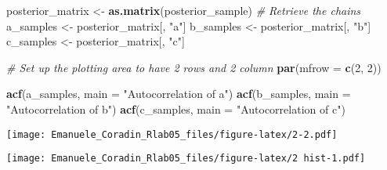 \documentclass[
]{article}
\newenvironment{Shaded}{\begin{snugshade}}{\end{snugshade}}
\newcommand{\AttributeTok}[1]{\textcolor[rgb]{0.13,0.29,0.53}{#1}}
\newcommand{\CommentTok}[1]{\textcolor[rgb]{0.56,0.35,0.01}{\textit{#1}}}
\newcommand{\ConstantTok}[1]{\textcolor[rgb]{0.56,0.35,0.01}{#1}}
\newcommand{\DecValTok}[1]{\textcolor[rgb]{0.00,0.00,0.81}{#1}}
\newcommand{\FunctionTok}[1]{\textcolor[rgb]{0.13,0.29,0.53}{\textbf{#1}}}
\newcommand{\NormalTok}[1]{#1}
\newcommand{\OtherTok}[1]{\textcolor[rgb]{0.56,0.35,0.01}{#1}}
\newcommand{\SpecialCharTok}[1]{\textcolor[rgb]{0.81,0.36,0.00}{\textbf{#1}}}
\newcommand{\StringTok}[1]{\textcolor[rgb]{0.31,0.60,0.02}{#1}}
\begin{document}
\begin{Shaded}
\begin{Highlighting}[]
\NormalTok{posterior\_matrix }\OtherTok{\textless{}{-}} \FunctionTok{as.matrix}\NormalTok{(posterior\_sample)}
\CommentTok{\# Retrieve the chains}
\NormalTok{a\_samples }\OtherTok{\textless{}{-}}\NormalTok{ posterior\_matrix[, }\StringTok{"a"}\NormalTok{]}
\NormalTok{b\_samples }\OtherTok{\textless{}{-}}\NormalTok{ posterior\_matrix[, }\StringTok{"b"}\NormalTok{]}
\NormalTok{c\_samples }\OtherTok{\textless{}{-}}\NormalTok{ posterior\_matrix[, }\StringTok{"c"}\NormalTok{]}

\CommentTok{\# Set up the plotting area to have 2 rows and 2 column}
\FunctionTok{par}\NormalTok{(}\AttributeTok{mfrow =} \FunctionTok{c}\NormalTok{(}\DecValTok{2}\NormalTok{, }\DecValTok{2}\NormalTok{))  }

\FunctionTok{acf}\NormalTok{(a\_samples, }\AttributeTok{main =} \StringTok{"Autocorrelation of a"}\NormalTok{)}
\FunctionTok{acf}\NormalTok{(b\_samples, }\AttributeTok{main =} \StringTok{"Autocorrelation of b"}\NormalTok{)}
\FunctionTok{acf}\NormalTok{(c\_samples, }\AttributeTok{main =} \StringTok{"Autocorrelation of c"}\NormalTok{)}
\end{Highlighting}
\end{Shaded}

\texttt{[image: Emanuele\_Coradin\_Rlab05\_files/figure-latex/2-2.pdf]}

\begin{Shaded}
\end{Shaded}

\texttt{[image: Emanuele\_Coradin\_Rlab05\_files/figure-latex/2 hist-1.pdf]}
\end{document}
